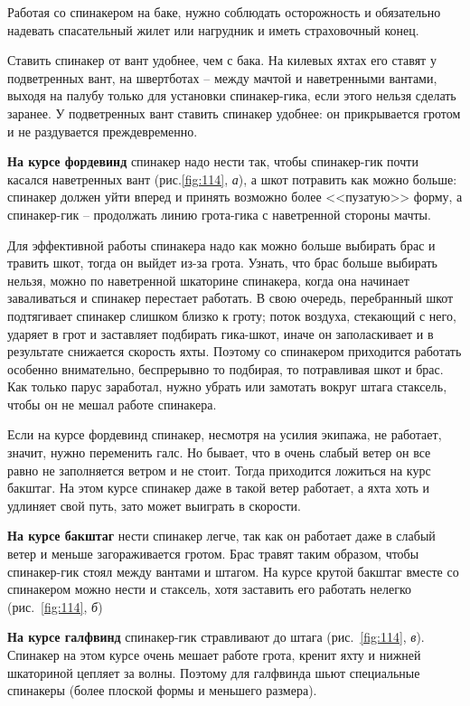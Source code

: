 \documentclass[a4paper, 12pt, twoside, final]{scrbook}
\begin{document}
Работая со спинакером на баке, нужно соблюдать осторожность и обязательно надевать спасательный жилет или нагрудник и иметь страховочный конец.

Ставить спинакер от вант удобнее, чем с бака. На килевых яхтах его ставят у подветренных вант, на швертботах \--- между мачтой и наветренными вантами, выходя на палубу только для установки спинакер-гика, если этого нельзя сделать заранее. У подветренных вант ставить спинакер удобнее: он прикрывается гротом и не раздувается преждевременно.

\textbf{На курсе фордевинд} спинакер надо нести так, чтобы спинакер-гик почти касался наветренных вант (рис.\ref{fig:114}, \textit{а}), а шкот потравить как можно больше: спинакер должен уйти вперед и принять возможно более <<пузатую>> форму, а спинакер-гик \--- продолжать линию грота-гика с наветренной стороны мачты.

Для эффективной работы спинакера надо как можно больше выбирать брас и травить шкот, тогда он выйдет из-за грота. Узнать, что брас больше выбирать нельзя, можно по наветренной шкаторине спинакера, когда она начинает заваливаться и спинакер перестает работать. В свою очередь, перебранный шкот подтягивает спинакер слишком близко к гроту; поток воздуха, стекающий с него, ударяет в грот и заставляет подбирать гика-шкот, иначе он заполаскивает и в результате снижается скорость яхты. Поэтому со спинакером приходится работать особенно внимательно, беспрерывно то подбирая, то потравливая шкот и брас. Как только парус заработал, нужно убрать или замотать вокруг штага стаксель, чтобы он не мешал работе спинакера.

Если на курсе фордевинд спинакер, несмотря на усилия экипажа, не работает, значит, нужно переменить галс. Но бывает, что в очень слабый ветер он все равно не заполняется ветром и не стоит. Тогда приходится ложиться на курс бакштаг. На этом курсе спинакер даже в такой ветер работает, а яхта хоть и удлиняет свой путь, зато может выиграть в скорости.

\textbf{На курсе бакштаг} нести спинакер легче, так как он работает даже в слабый ветер и меньше загораживается гротом. Брас травят таким образом, чтобы спинакер-гик стоял между вантами и штагом. На курсе крутой бакштаг вместе со спинакером можно нести и стаксель, хотя заставить его работать нелегко (рис.~\ref{fig:114}, \textit{б})

\textbf{На курсе галфвинд} спинакер-гик стравливают до штага (рис.~\ref{fig:114}, \textit{в}). Спинакер на этом курсе очень мешает работе грота, кренит яхту и нижней шкаториной цепляет за волны. Поэтому для галфвинда шьют специальные спинакеры (более плоской формы и меньшего размера).
\end{document}
